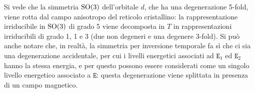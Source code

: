 Si vede che la simmetria $ \mathrm{SO}(3) $ dell'orbitale $ d $, che ha una degenerazione 5-fold, viene rotta dal campo anisotropo del reticolo cristallino: la rappresentazione irriducibile in $ \mathrm{SO}(3) $ di grado 5 viene decomposta in $ T $ in rappresentazioni irriducibili di grado 1, 1 e 3 (due non degeneri e una degenere 3-fold). Si può anche notare che, in realtà, la simmetria per inversione temporale fa sì che ci sia una degenerazione accidentale, per cui i livelli energetici associati ad $ \mathtt{E}_1 $ ed $ \mathtt{E}_2 $ hanno la stessa energia, e per questo possono essere considerati come un singolo livello energetico associato a $ \mathtt{E} $: questa degenerazione viene splittata in presenza di un campo magnetico.










